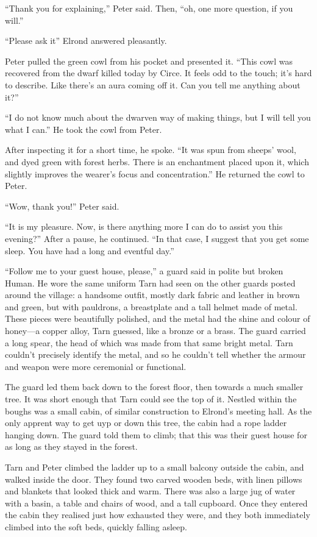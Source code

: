``Thank you for explaining,'' Peter said.  Then, ``oh, one more question, if you will.''

``Please ask it'' Elrond answered pleasantly.

Peter pulled the green cowl from his pocket and presented it.  ``This cowl was recovered from the dwarf killed today by Circe.  It feels odd to the touch; it's hard to describe.  Like there's an aura coming off it.  Can you tell me anything about it?''

``I do not know much about the dwarven way of making things, but I will tell you what I can.''  He took the cowl from Peter.

After inspecting it for a short time, he spoke.  ``It was spun from sheeps' wool, and dyed green with forest herbs.  There is an enchantment placed upon it, which slightly improves the wearer's focus and concentration.''  He returned the cowl to Peter.

``Wow, thank you!'' Peter said.

``It is my pleasure.  Now, is there anything more I can do to assist you this evening?''  After a pause, he continued.  ``In that case, I suggest that you get some sleep.  You have had a long and eventful day.''

``Follow me to your guest house, please,'' a guard said in polite but broken Human.  He wore the same uniform Tarn had seen on the other guards posted around the village: a handsome outfit, mostly dark fabric and leather in brown and green, but with pauldrons, a breastplate and a tall helmet made of metal.  These pieces were beautifully polished, and the metal had the shine and colour of honey---a copper alloy, Tarn guessed, like a bronze or a brass.  The guard carried a long spear, the head of which was made from that same bright metal.  Tarn couldn't precisely identify the metal, and so he couldn't tell whether the armour and weapon were more ceremonial or functional.

The guard led them back down to the forest floor, then towards a much smaller tree.  It was short enough that Tarn could see the top of it.  Nestled within the boughs was a small cabin, of similar construction to Elrond's meeting hall.  As the only apprent way to get uyp or down this tree, the cabin had a rope ladder hanging down.  The guard told them to climb; that this was their guest house for as long as they stayed in the forest.

Tarn and Peter climbed the ladder up to a small balcony outside the cabin, and walked inside the door.  They found two carved wooden beds, with linen pillows and blankets that looked thick and warm.  There was also a large jug of water with a basin, a table and chairs of wood, and a tall cupboard.  Once they entered the cabin they realised just how exhausted they were, and they both immediately climbed into the soft beds, quickly falling asleep.

